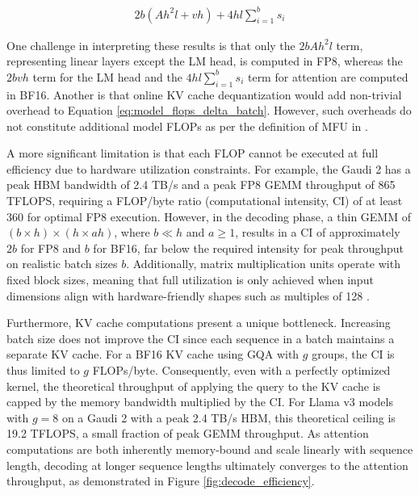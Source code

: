 \begin{equation}
\begin{aligned}
    2b(Ah^2l+vh)+4hl\sum_{i=1}^{b}s_i
\label{eq:model_flops_delta_batch}
\end{aligned}
\end{equation}

One challenge in interpreting these results is that only the $2bAh^2l$ term, representing linear layers except the LM head, is computed in FP8, whereas the $2bvh$ term for the LM head and the $4hl\sum_{i=1}^{b}s_i$ term for attention are computed in BF16.
Another is that online KV cache dequantization would add non-trivial overhead to Equation \ref{eq:model_flops_delta_batch}. However, such overheads do not constitute additional model FLOPs as per the definition of MFU in \citet{palm}.

A more significant limitation is that each FLOP cannot be executed at full efficiency due to hardware utilization constraints. For example, the Gaudi 2 has a peak HBM bandwidth of 2.4 TB/s and a peak FP8 GEMM throughput of 865 TFLOPS, requiring a FLOP/byte ratio (computational intensity, CI) of at least 360 for optimal FP8 execution.
However, in the decoding phase, a thin GEMM of  $(b \times h)\times (h \times ah)$, where $b \ll h$ and $a \ge 1$, results in a CI of approximately $2b$ for FP8 and $b$ for BF16, far below the required intensity for peak throughput on realistic batch sizes $b$.
Additionally, matrix multiplication units operate with fixed block sizes, meaning that full utilization is only achieved when input dimensions align with hardware-friendly shapes such as multiples of 128 \citep{lee2024debunkingcudamythgpubased}.

Furthermore, KV cache computations present a unique bottleneck. Increasing batch size does not improve the CI since each sequence in a batch maintains a separate KV cache.
For a BF16 KV cache using GQA with $g$ groups, the CI is thus limited to $g$ FLOPs/byte. 
Consequently, even with a perfectly optimized kernel, the theoretical throughput of applying the query to the KV cache is capped by the memory bandwidth multiplied by the CI. For Llama v3 models with $g=8$ on a Gaudi 2 with a peak 2.4 TB/s HBM, this theoretical ceiling is 19.2 TFLOPS, a small fraction of peak GEMM throughput. As attention computations are both inherently memory-bound and scale linearly with sequence length, decoding at longer sequence lengths ultimately converges to the attention throughput, as demonstrated in Figure \ref{fig:decode_efficiency}.

